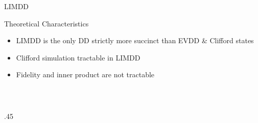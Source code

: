 \begin{refframe}{LIMDD}
	
%

\vspace{-.5em}

\begin{block}{Theoretical Characteristics~\cite{vinkhuijzen2023efficient}}
\vspace{-.5em}
	\begin{itemize}
		\item<+-> LIMDD is the only DD strictly more succinct than EVDD \& Clifford states 
		\item<+-> Clifford simulation tractable in LIMDD
		\item<+-> Fidelity and inner product are not tractable~\cite{vinkhuijzen2024a}
	\end{itemize}
	\vspace{-.5em}
\end{block}

~\\


\begin{columns}
\begin{column}{.45\textwidth}	
\centering
{}
\end{column}
\end{columns}
\end{refframe}
